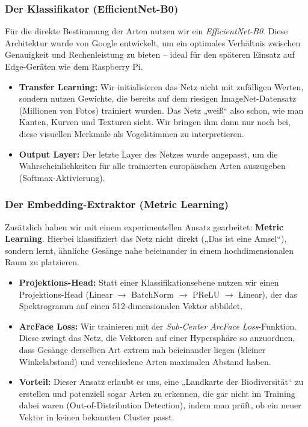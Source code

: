 \documentclass[10pt, a4paper]{scrartcl}
\begin{document}
\subsubsection{Der Klassifikator (EfficientNet-B0)}
Für die direkte Bestimmung der Arten nutzen wir ein \textit{EfficientNet-B0}. Diese Architektur wurde von Google entwickelt, um ein optimales Verhältnis zwischen Genauigkeit und Rechenleistung zu bieten – ideal für den späteren Einsatz auf Edge-Geräten wie dem Raspberry Pi.
\begin{itemize}
    \item \textbf{Transfer Learning:} Wir initialisieren das Netz nicht mit zufälligen Werten, sondern nutzen Gewichte, die bereits auf dem riesigen ImageNet-Datensatz (Millionen von Fotos) trainiert wurden. Das Netz „weiß“ also schon, wie man Kanten, Kurven und Texturen sieht. Wir bringen ihm dann nur noch bei, diese visuellen Merkmale als Vogelstimmen zu interpretieren.
    \item \textbf{Output Layer:} Der letzte Layer des Netzes wurde angepasst, um die Wahrscheinlichkeiten für alle trainierten europäischen Arten auszugeben (Softmax-Aktivierung).
\end{itemize}

\subsubsection{Der Embedding-Extraktor (Metric Learning)}
Zusätzlich haben wir mit einem experimentellen Ansatz gearbeitet: \textbf{Metric Learning}. Hierbei klassifiziert das Netz nicht direkt („Das ist eine Amsel“), sondern lernt, ähnliche Gesänge nahe beieinander in einem hochdimensionalen Raum zu platzieren.
\begin{itemize}
    \item \textbf{Projektions-Head:} Statt einer Klassifikationsebene nutzen wir einen Projektions-Head (Linear $\rightarrow$ BatchNorm $\rightarrow$ PReLU $\rightarrow$ Linear), der das Spektrogramm auf einen 512-dimensionalen Vektor abbildet.
    \item \textbf{ArcFace Loss:} Wir trainieren mit der \textit{Sub-Center ArcFace Loss}-Funktion. Diese zwingt das Netz, die Vektoren auf einer Hypersphäre so anzuordnen, dass Gesänge derselben Art extrem nah beieinander liegen (kleiner Winkelabstand) und verschiedene Arten maximalen Abstand haben.
    \item \textbf{Vorteil:} Dieser Ansatz erlaubt es uns, eine „Landkarte der Biodiversität“ zu erstellen und potenziell sogar Arten zu erkennen, die gar nicht im Training dabei waren (Out-of-Distribution Detection), indem man prüft, ob ein neuer Vektor in keinen bekannten Cluster passt.
\end{itemize}
\end{document}
